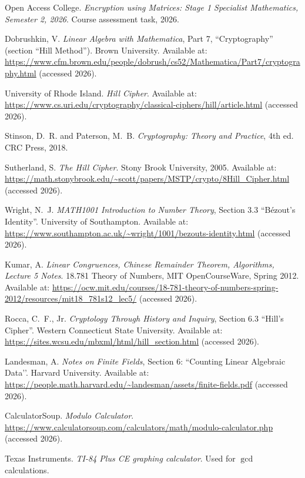 \documentclass[11pt,a4paper]{article}
\theoremstyle{plain}
\theoremstyle{definition}
\begin{document}
\begin{enumerate}[label={[\arabic*]},leftmargin=2em,itemsep=0.1em]

\item Open Access College. \textit{Encryption using Matrices: Stage 1 Specialist Mathematics, Semester 2, 2026}. Course assessment task, 2026.

\item Dobrushkin, V. \textit{Linear Algebra with Mathematica}, Part 7, ``Cryptography'' (section ``Hill Method''). Brown University. Available at: \url{https://www.cfm.brown.edu/people/dobrush/cs52/Mathematica/Part7/cryptography.html} (accessed 2026).

\item University of Rhode Island. \textit{Hill Cipher}. Available at: \url{https://www.cs.uri.edu/cryptography/classical-ciphers/hill/article.html} (accessed 2026).

\item Stinson, D.\ R. and Paterson, M.\ B. \textit{Cryptography: Theory and Practice}, 4th ed. CRC Press, 2018.

\item Sutherland, S. \textit{The Hill Cipher}. Stony Brook University, 2005. Available at: \url{https://math.stonybrook.edu/~scott/papers/MSTP/crypto/8Hill_Cipher.html} (accessed 2026).

\item Wright, N.\ J. \textit{MATH1001 Introduction to Number Theory}, Section 3.3 ``Bézout’s Identity''. University of Southampton. Available at: \url{https://www.southampton.ac.uk/~wright/1001/bezouts-identity.html} (accessed 2026).

\item Kumar, A. \textit{Linear Congruences, Chinese Remainder Theorem, Algorithms, Lecture 5 Notes}. 18.781 Theory of Numbers, MIT OpenCourseWare, Spring 2012. Available at: \url{https://ocw.mit.edu/courses/18-781-theory-of-numbers-spring-2012/resources/mit18_781s12_lec5/} (accessed 2026).

\item Rocca, C.\ F., Jr. \textit{Cryptology Through History and Inquiry}, Section 6.3 ``Hill’s Cipher''. Western Connecticut State University. Available at: \url{https://sites.wcsu.edu/mbxml/html/hill_section.html} (accessed 2026).

\item Landesman, A. \textit{Notes on Finite Fields}, Section 6: ``Counting Linear Algebraic Data’’. Harvard University. Available at: \url{https://people.math.harvard.edu/~landesman/assets/finite-fields.pdf} (accessed 2026).

\item CalculatorSoup. \textit{Modulo Calculator}. \url{https://www.calculatorsoup.com/calculators/math/modulo-calculator.php} (accessed 2026).

\item Texas Instruments. \textit{TI-84 Plus CE graphing calculator}. Used for $\gcd$ calculations.

\end{enumerate}
\end{document}
